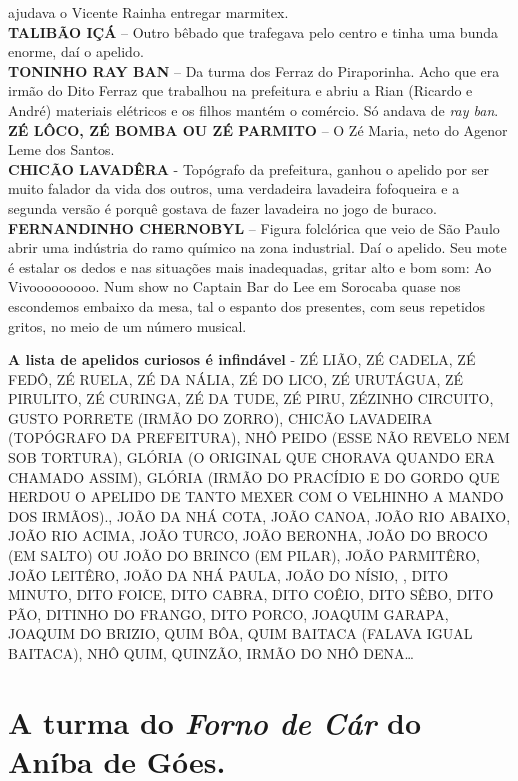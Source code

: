 \documentclass[12pt,brazil,]{book}
\begin{document}
ajudava o Vicente Rainha entregar marmitex.\\
\textbf{TALIBÃO IÇÁ} -- Outro bêbado que trafegava pelo centro e tinha
uma bunda enorme, daí o apelido.\\
\textbf{TONINHO RAY BAN} -- Da turma dos Ferraz do Piraporinha. Acho que
era irmão do Dito Ferraz que trabalhou na prefeitura e abriu a Rian
(Ricardo e André) materiais elétricos e os filhos mantém o comércio. Só
andava de \emph{ray ban}.\\
\textbf{ZÉ LÔCO, ZÉ BOMBA OU ZÉ PARMITO} -- O Zé Maria, neto do Agenor
Leme dos Santos.\\
\textbf{CHICÃO LAVADÊRA} - Topógrafo da prefeitura, ganhou o apelido por
ser muito falador da vida dos outros, uma verdadeira lavadeira
fofoqueira e a segunda versão é porquê gostava de fazer lavadeira no
jogo de buraco.\\
\textbf{FERNANDINHO CHERNOBYL} -- Figura folclórica que veio de São
Paulo abrir uma indústria do ramo químico na zona industrial. Daí o
apelido. Seu mote é estalar os dedos e nas situações mais inadequadas,
gritar alto e bom som: Ao Vivooooooooo. Num show no Captain Bar do Lee
em Sorocaba quase nos escondemos embaixo da mesa, tal o espanto dos
presentes, com seus repetidos gritos, no meio de um número musical.

\textbf{A lista de apelidos curiosos é infindável} - ZÉ LIÃO, ZÉ CADELA,
ZÉ FEDÔ, ZÉ RUELA, ZÉ DA NÁLIA, ZÉ DO LICO, ZÉ URUTÁGUA, ZÉ PIRULITO, ZÉ
CURINGA, ZÉ DA TUDE, ZÉ PIRU, ZÉZINHO CIRCUITO, GUSTO PORRETE (IRMÃO DO
ZORRO), CHICÃO LAVADEIRA (TOPÓGRAFO DA PREFEITURA), NHÔ PEIDO (ESSE NÃO
REVELO NEM SOB TORTURA), GLÓRIA (O ORIGINAL QUE CHORAVA QUANDO ERA
CHAMADO ASSIM), GLÓRIA (IRMÃO DO PRACÍDIO E DO GORDO QUE HERDOU O
APELIDO DE TANTO MEXER COM O VELHINHO A MANDO DOS IRMÃOS)., JOÃO DA NHÁ
COTA, JOÃO CANOA, JOÃO RIO ABAIXO, JOÃO RIO ACIMA, JOÃO TURCO, JOÃO
BERONHA, JOÃO DO BROCO (EM SALTO) OU JOÃO DO BRINCO (EM PILAR), JOÃO
PARMITÊRO, JOÃO LEITÊRO, JOÃO DA NHÁ PAULA, JOÃO DO NÍSIO, , DITO
MINUTO, DITO FOICE, DITO CABRA, DITO COÊIO, DITO SÊBO, DITO PÃO, DITINHO
DO FRANGO, DITO PORCO, JOAQUIM GARAPA, JOAQUIM DO BRIZIO, QUIM BÔA, QUIM
BAITACA (FALAVA IGUAL BAITACA), NHÔ QUIM, QUINZÃO, IRMÃO DO NHÔ
DENA\ldots{}

\section{\texorpdfstring{A turma do \emph{Forno de Cár} do Aníba de
Góes.}{A turma do Forno de Cár do Aníba de Góes.}}\label{a-turma-do-forno-de-cuxe1r-do-anuxedba-de-guxf3es.}
\end{document}
